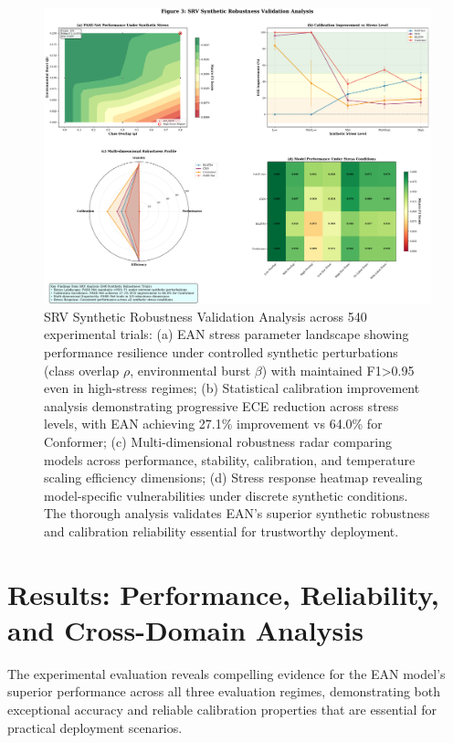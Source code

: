 \documentclass[lettersize,journal]{IEEEtran}
\begin{document}
\begin{figure}[t]
\centering
\includegraphics[width=\linewidth]{plots/fig3_srv_robustness_v4.pdf}
\caption{SRV Synthetic Robustness Validation Analysis across 540 experimental trials: (a) EAN stress parameter landscape showing performance resilience under controlled synthetic perturbations (class overlap $\rho$, environmental burst $\beta$) with maintained F1>0.95 even in high-stress regimes; (b) Statistical calibration improvement analysis demonstrating progressive ECE reduction across stress levels, with EAN achieving 27.1\% improvement vs 64.0\% for Conformer; (c) Multi-dimensional robustness radar comparing models across performance, stability, calibration, and temperature scaling efficiency dimensions; (d) Stress response heatmap revealing model-specific vulnerabilities under discrete synthetic conditions. The thorough analysis validates EAN's superior synthetic robustness and calibration reliability essential for trustworthy deployment.}
\label{fig:calibration}
\end{figure}

\section{Results: Performance, Reliability, and Cross-Domain Analysis}

The experimental evaluation reveals compelling evidence for the EAN model's superior performance across all three evaluation regimes, demonstrating both exceptional accuracy and reliable calibration properties that are essential for practical deployment scenarios.
\end{document}
